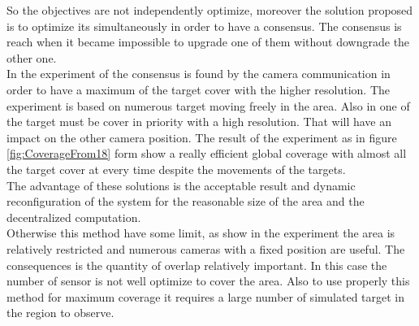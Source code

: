 So the objectives are not independently optimize, moreover  the  solution proposed is to optimize its  simultaneously in order to have a consensus. The consensus is reach when it became impossible to upgrade one of them without downgrade the other one.\\
  In the experiment of \cite{18*ding2012,25*song2008} the consensus is found by the camera communication in order to have a maximum of the target cover with the higher resolution.
 The experiment is based on numerous target moving freely in the area. Also in \cite{18*ding2012} one of the target must be cover in priority with a high resolution. That will have an impact on the other camera position.
 The result of the experiment as in figure \ref{fig:CoverageFrom18} form \cite{18*ding2012} show a really efficient global coverage with almost all the target cover at every time despite the movements of the targets. \\
 The advantage of these solutions is the acceptable result and dynamic reconfiguration of the system for the reasonable size of the area and the decentralized computation.\\
Otherwise this method have some limit, as show in the experiment the area is relatively restricted and numerous cameras with a fixed position are useful. The consequences is the quantity of overlap relatively important. In this case the number of sensor is not well optimize to cover the area. Also to use properly this method for maximum coverage it requires a large number of simulated target in the region to observe. 

